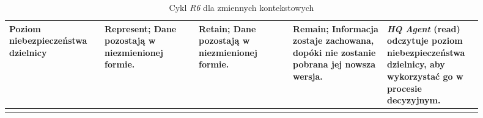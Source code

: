 \begin{landscape}
\begin{longtable}{|p{0.18\linewidth}|p{0.18\linewidth}|p{0.18\linewidth}|p{0.18\linewidth}|p{0.18\linewidth}|}
     Poziom niebezpieczeństwa dzielnicy & \textbf{Represent}; Dane pozostają w niezmienionej formie. & \textbf{Retain}; Dane pozostają w niezmienionej formie. & \textbf{Remain}; Informacja zostaje zachowana, dopóki nie zostanie pobrana jej nowsza wersja.  & \emph{HQ Agent} (\textbf{read}) odczytuje poziom niebezpieczeństwa dzielnicy, aby wykorzystać go w procesie decyzyjnym. \\
     \hline
     
    \caption{Cykl \emph{R6} dla zmiennych kontekstowych}
    \label{tab:r6CycleForContextData}
    \end{longtable}
\end{landscape}



